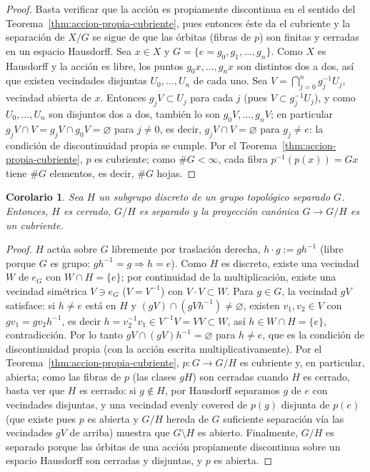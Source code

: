 \documentclass[11pt,a4paper]{article}
\theoremstyle{plain}
\newtheorem{corollary}[theorem]{Corolario}
\theoremstyle{definition}
\theoremstyle{remark}
\begin{document}
\begin{proof}
Basta verificar que la acción es propiamente discontinua en el sentido del
Teorema~\ref{thm:accion-propia-cubriente}, pues entonces éste da el
cubriente y la separación de $X/G$ se sigue de que las órbitas (fibras de
$p$) son finitas y cerradas en un espacio Hausdorff. Sea $x\in X$ y
$G=\{e=g_0,g_1,\dots,g_n\}$. Como $X$ es Hausdorff y la acción es libre,
los puntos $g_0x,\dots,g_nx$ son distintos dos a dos, así que existen
vecindades disjuntas $U_0,\dots,U_n$ de cada uno. Sea
$V=\bigcap_{j=0}^ng_j^{-1}U_j$, vecindad abierta de $x$. Entonces
$g_jV\subset U_j$ para cada $j$ (pues $V\subset g_j^{-1}U_j$), y como
$U_0,\dots,U_n$ son disjuntos dos a dos, también lo son
$g_0V,\dots,g_nV$; en particular $g_jV\cap V=g_jV\cap g_0V=\varnothing$
para $j\ne0$, es decir, $g_jV\cap V=\varnothing$ para $g_j\ne e$: la
condición de discontinuidad propia se cumple. Por el
Teorema~\ref{thm:accion-propia-cubriente}, $p$ es cubriente; como
$\#G<\infty$, cada fibra $p^{-1}(p(x))=Gx$ tiene $\#G$ elementos, es
decir, $\#G$ hojas.
\end{proof}

\begin{corollary}
\label{cor:subgrupo-discreto-cubriente}
Sea $H$ un subgrupo discreto de un grupo topológico separado $G$. Entonces,
$H$ es cerrado, $G/H$ es separado y la proyección canónica $G\to G/H$ es un
cubriente.
\end{corollary}

\begin{proof}
$H$ actúa sobre $G$ libremente por traslación derecha, $h\cdot g:=gh^{-1}$
(libre porque $G$ es grupo: $gh^{-1}=g\Rightarrow h=e$). Como $H$ es
discreto, existe una vecindad $W$ de $e_G$ con $W\cap H=\{e\}$; por
continuidad de la multiplicación, existe una vecindad simétrica $V\ni e_G$
($V=V^{-1}$) con $V\cdot V\subset W$. Para $g\in G$, la vecindad $gV$
satisface: si $h\ne e$ está en $H$ y $(gV)\cap(gVh^{-1})\ne\varnothing$,
existen $v_1,v_2\in V$ con $gv_1=gv_2h^{-1}$, es decir $h=v_2^{-1}v_1\in V^{-1}V=VV\subset W$,
así $h\in W\cap H=\{e\}$, contradicción. Por lo tanto $gV\cap(gV)h^{-1}=\varnothing$
para $h\ne e$, que es la condición de discontinuidad propia (con la acción
escrita multiplicativamente). Por el Teorema~\ref{thm:accion-propia-cubriente},
$p:G\to G/H$ es cubriente y, en particular, abierta; como las fibras de
$p$ (las clases $gH$) son cerradas cuando $H$ es cerrado, basta ver que
$H$ es cerrado: si $g\notin H$, por Hausdorff separamos $g$ de $e$ con
vecindades disjuntas, y una vecindad evenly covered de $p(g)$ disjunta de
$p(e)$ (que existe pues $p$ es abierta y $G/H$ hereda de $G$ suficiente
separación vía las vecindades $gV$ de arriba) muestra que $G\setminus H$
es abierto. Finalmente, $G/H$ es separado porque las órbitas de una acción
propiamente discontinua sobre un espacio Hausdorff son cerradas y
disjuntas, y $p$ es abierta.
\end{proof}
\end{document}
